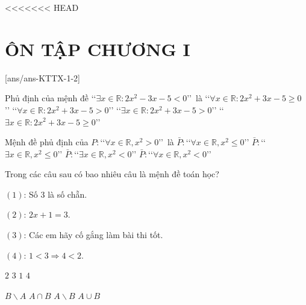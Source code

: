<<<<<<< HEAD
﻿\section*{ÔN TẬP CHƯƠNG I}
\setcounter{ex}{0}\setcounter{bt}{0}
[ans/ans-KTTX-1-2]

\begin{ex}%
Phủ định của mệnh đề \lq\lq  $\exists x\in \mathbb{R}:2x^2-3x-5<0$\rq\rq\  là
\choice
{ \True \lq\lq  $\forall x\in \mathbb{R}:2x^2+3x-5\ge 0$ \rq\rq }
{\lq\lq  $\forall x\in \mathbb{R}:2x^2+3x-5>0$\rq\rq }
{\lq\lq  $\exists x\in \mathbb{R}:2x^2+3x-5>0$\rq\rq}
{ \lq\lq $\exists x\in \mathbb{R}:2x^2+3x-5\ge 0$\rq\rq }
\end{ex}

\begin{ex}%
Mệnh đề phủ định của $P\colon$\lq\lq $\forall x \in \mathbb{R}, x^{2}>0$\rq\rq\,  là
\choice
{$\bar{P}\colon$\lq\lq $\forall x \in \mathbb{R}, x^{2} \leq 0$\rq\rq}
{\True $\bar{P}\colon$\lq\lq $\exists x \in \mathbb{R}, x^{2} \leq 0$\rq\rq}
{$\bar{P}\colon$\lq\lq $\exists x \in \mathbb{R}, x^{2}< 0$\rq\rq}
{$\bar{P}\colon$\lq\lq $\forall x \in \mathbb{R}, x^{2}< 0$\rq\rq}
\end{ex}

\begin{ex}%
Trong các câu sau có bao nhiêu câu là mệnh đề toán học?
\begin{listEX}[2]
\item[] $(1)$: Số $3$ là số chẵn.
\item[] $(2)$: $2x+1=3$.
\item[] $(3)$: Các em hãy cố gắng làm bài thi tốt.
\item[] $(4)$: $1<3 \Rightarrow 4<2$.
\end{listEX}
\choice
{\True $2$}
{$3$}
{$1$}
{$4$}
\end{ex}

\begin{ex}%
\choice
{ $B\backslash A$ }
{\True $A \cap B$ }
{  $A\backslash B$}
{ $A \cup B$ }
\loigiai{
}
\end{ex}

